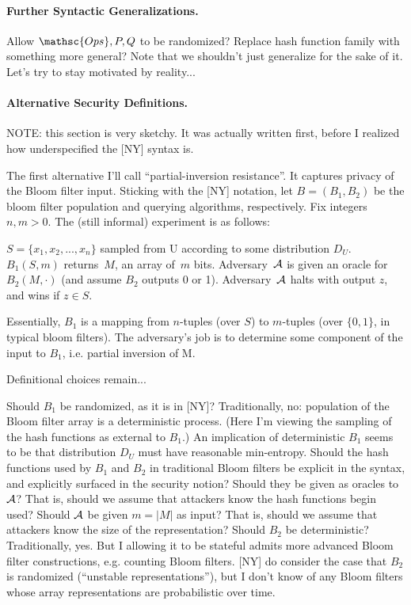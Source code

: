\paragraph{Further Syntactic Generalizations. }

Allow $\mathsc{Ops}, P, Q$ to be randomized?  Replace hash function family with something more general?  Note that we shouldn’t just generalize for the sake of it.  Let’s try to stay motivated by reality...

\paragraph{Alternative Security Definitions. }

NOTE: this section is very sketchy.  It was actually written first, before I realized how underspecified the [NY] syntax is.

The first alternative I’ll call “partial-inversion resistance”.  It captures privacy of the Bloom filter input.  Sticking with the [NY] notation, let $B=(B_1, B_2)$ be the bloom filter population and querying algorithms, respectively.  Fix integers $n,m > 0$.  The (still informal) experiment is as follows: 

$S=\{x_1,x_2,..., x_n\}$ sampled from U according to some distribution $D_U$.  $B_1(S,m)$ returns~$M$, an array of~$m$ bits. Adversary~$\mathcal{A}$ is given an oracle for $B_2(M,\cdot)$  (and assume $B_2$ outputs 0 or 1).  Adversary~$\mathcal{A}$ halts with output $z$, and wins if $z \in S$.

Essentially, $B_1$ is a mapping from $n$-tuples (over $S$) to $m$-tuples (over $\{0,1\}$, in typical bloom filters).  The adversary’s job is to determine some component of the input to $B_1$, i.e. partial inversion of M. 

Definitional choices remain...

Should $B_1$ be randomized, as it is in [NY]?  Traditionally, no: population of the Bloom filter array is a deterministic process.  (Here I’m viewing the sampling of the hash functions as external to $B_1$.)   An implication of deterministic $B_1$ seems to be that distribution $D_U$ must have reasonable min-entropy.  
Should the hash functions used by $B_1$ and $B_2$ in traditional Bloom filters be explicit in the syntax, and explicitly surfaced in the security notion?  
Should they be given as oracles to $\mathcal{A}$?  That is, should we assume that attackers know the hash functions begin used? Should $\mathcal{A}$ be given $m = |M|$ as input?  That is, should we assume that attackers know the size of the representation?
Should $B_2$ be deterministic?  Traditionally, yes.  But I allowing it to be stateful admits more advanced Bloom filter constructions, e.g. counting Bloom filters.  [NY] do consider the case that $B_2$ is randomized (“unstable representations”), but I don’t know of any Bloom filters whose array representations are probabilistic over time.

